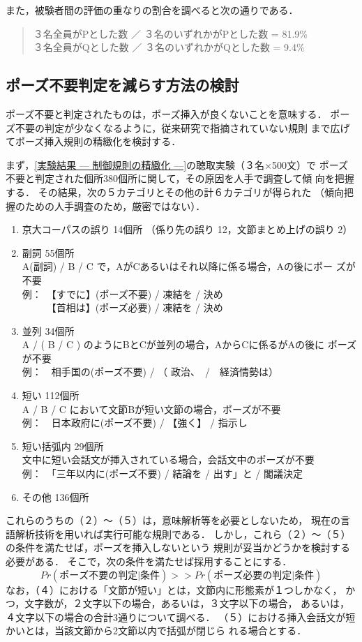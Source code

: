   また，被験者間の評価の重なりの割合を調べると次の通りである．
\begin{quote}
   ３名全員がPとした数  ／ ３名のいずれかがPとした数 = 81.9\% \\
   ３名全員がQとした数  ／ ３名のいずれかがQとした数 =  9.4\%
\end{quote}

\subsection{ポーズ不要判定を減らす方法の検討}

ポーズ不要と判定されたものは，ポーズ挿入が良くないことを意味する．
ポーズ不要の判定が少なくなるように，従来研究で指摘されていない規則
まで広げてポーズ挿入規則の精緻化を検討する．

まず，\ref{実験結果 — 制御規則の精緻化 —}の聴取実験（３名×500文）で
ポーズ不要と判定された個所380個所に関して，その原因を人手で調査して傾
向を把握する．
その結果，次の５カテゴリとその他の計６カテゴリが得られた
（傾向把握のための人手調査のため，厳密ではない）．
\begin{enumerate}
   \item 京大コーパスの誤り 14個所 （係り先の誤り 12，文節まとめ上げの誤り 2）
   \item 副詞  55個所 \\
	 A(副詞) / B / C で，AがCあるいはそれ以降に係る場合，Aの後にポー
	 ズが不要\\
	 例：　【すでに】(ポーズ不要) / 凍結を / 決め \\
	 　　　【首相は】(ポーズ必要) / 凍結を / 決め 
   \item 並列 34個所 \\
	 A / ( B / C ) のようにBとCが並列の場合，AからCに係るがAの後に
	 ポーズが不要\\
	 例：　相手国の(ポーズ不要) / （ 政治、　/　経済情勢は）
   \item 短い 112個所 \\
	 A / B / C において文節Bが短い文節の場合，ポーズが不要\\
	 例：　日本政府に(ポーズ不要) / 【強く】 / 指示し
   \item 短い括弧内 29個所 \\
	 文中に短い会話文が挿入されている場合，会話文中のポーズが不要\\
	 例：　「三年以内に(ポーズ不要) / 結論を / 出す」と / 閣議決定
   \item その他 136個所
\end{enumerate}
これらのうちの（２）〜（５）は，意味解析等を必要としないため，
現在の言語解析技術を用いれば実行可能な規則である．
しかし，これら（２）〜（５）の条件を満たせば，ポーズを挿入しないという
規則が妥当かどうかを検討する必要がある．
そこで，次の条件を満たせば採用することにする．
\begin{displaymath}
  Pr(ポーズ不要の判定 | 条件) >> Pr(ポーズ必要の判定 | 条件)
\end{displaymath}
なお，（４）における「文節が短い」とは，文節内に形態素が１つしかなく，
かつ，文字数が，２文字以下の場合，あるいは，３文字以下の場合，
あるいは，４文字以下の場合の合計3通りについて調べる．
（５）における挿入会話文が短かいとは，当該文節から2文節以内で括弧が閉じら
れる場合とする．

